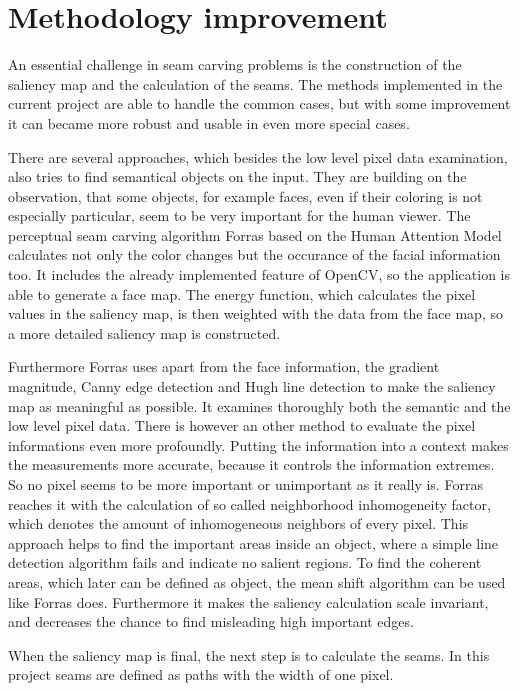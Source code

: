 \documentclass[draft,final]{vutinfth} %
\begin{document}
	\section{Methodology improvement}
	An essential challenge in seam carving problems is the construction of the saliency map and the calculation of the seams. 
	The methods implemented in the current project are able to handle the common cases, but with some improvement it can became more robust and usable in even more special cases.\par 
	There are several approaches, which besides the low level pixel data examination, also tries to find semantical objects on the input.
	They are building on the observation, that some objects, for example faces, even if their coloring is not especially particular, seem to be very important for the human viewer.
	The perceptual seam carving algorithm Forras based on the Human Attention Model calculates not only the color changes but the occurance of the facial information too.
	It includes the already implemented feature of OpenCV, so the application is able to generate a face map.
	The energy function, which calculates the pixel values in the saliency map, is then weighted with the data from the face map, so a more detailed saliency map is constructed.\par 
	Furthermore Forras uses apart from the face information, the gradient magnitude, Canny edge detection and Hugh line detection to make the saliency map as meaningful as possible. 
	It examines thoroughly both the semantic and the low level pixel data.
	There is however an other method to evaluate the pixel informations even more profoundly.
	Putting the information into a context makes the measurements more accurate, because it controls the information extremes.
	So no pixel seems to be more important or unimportant as it really is.
	Forras reaches it with the calculation of so called neighborhood inhomogeneity factor, which denotes the amount of inhomogeneous neighbors of every pixel. 
	This approach helps to find the important areas inside an object, where a simple line detection algorithm fails and indicate no salient regions.
	To find the coherent areas, which later can be defined as object, the mean shift algorithm can be used like Forras does. 
	Furthermore it makes the saliency calculation scale invariant, and decreases the chance to find misleading high important edges.\par 
	When the saliency map is final, the next step is to calculate the seams.
	In this project seams are defined as paths with the width of one pixel.
\end{document}
